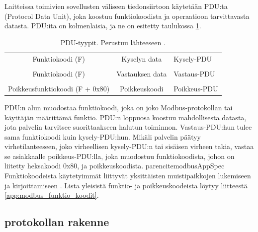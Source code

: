     Laitteissa toimivien sovellusten väliseen tiedonsiirtoon käytetään \gls{PDU}:ta (Protocol Data Unit), joka koostuu funktiokoodista ja operaatioon tarvittavasta datasta. \gls{PDU}:ita on kolmenlaisia, ja ne on esitetty taulukossa \ref{pdu}.
    \begin{table}[h]
      \centering
      \caption[\gls{PDU}-tyypit.]{\gls{PDU}-tyypit. Perustuu lähteeseen \parencite{modbusAppSpec}.}
      \begin{tabular}{ccl}
      \cline{1-2}
      \multicolumn{1}{|c|}{\cellcolor[HTML]{5CB735}Funktiokoodi (F)}                & \multicolumn{1}{c|}{\cellcolor[HTML]{5CB735}Kyselyn data}    & Kysely-PDU   \\ \cline{1-2}
                                                                                    &                                                              &              \\ \cline{1-2}
      \multicolumn{1}{|c|}{\cellcolor[HTML]{5CB735}Funktiokoodi (F)}                & \multicolumn{1}{c|}{\cellcolor[HTML]{5CB735}Vastauksen data} & Vastaus-PDU  \\ \cline{1-2}
                                                                                    &                                                              &              \\ \cline{1-2}
      \multicolumn{1}{|c|}{\cellcolor[HTML]{D78989}Poikkeusfunktiokoodi (F + 0x80)} & \multicolumn{1}{c|}{\cellcolor[HTML]{D78989}Poikkeuskoodi}   & Poikkeus-PDU \\ \cline{1-2}
    \end{tabular}
      \label{pdu}
    \end{table}

    \gls{PDU}:n alun muodostaa funktiokoodi, joka on joko Modbus-protokollan tai käyttäjän määrittämä funktio. PDU:n loppuosa koostuu mahdollisesta datasta, jota palvelin tarvitsee suorittaakseen halutun toiminnon. Vastaus-PDU:hun tulee sama funktiokoodi kuin kysely-PDU:hun. Mikäli palvelin päätyy virhetilanteeseen, joko virheellisen kysely-PDU:n tai sisäisen virheen takia, vastaa se asiakkaalle poikkeus-PDU:lla, joka muodostuu funktiokoodista, johon on liitetty heksakoodi 0x80, ja poikkeuskoodista. parencite{modbusAppSpec} Funktiokoodeista käytetyimmät liittyvät yksittäisten muistipaikkojen lukemiseen ja kirjoittamiseen \parencite{DincerRosen}. Lista yleisistä funktio- ja poikkeuskoodeista löytyy liitteestä \ref{app:modbus_funktio_koodit}.


  \subsection{protokollan rakenne}

